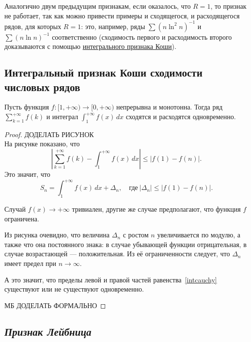 \begin{remark}
	Аналогично двум предыдущим признакам, если оказалось, что \(R = 1\), то признак не работает, так как можно привести примеры и сходящегося, и расходящегося рядов, для которых \(R = 1\): это, например, ряды \(\sum (n \ln^2 n)^{-1}\) и \(\sum (n \ln n)^{-1}\) соответственно (сходимость первого и расходимость второго доказываются с помощью \hyperlink{интегральный признак Коши}{ интегрального признака Коши}).
\end{remark}

\subsection{Интегральный признак Коши сходимости числовых рядов}

\begin{theorem} \hypertarget{интегральный признак Коши}{}
	Пусть функция \(f \colon [1, +\infty) \to [0, +\infty)\) непрерывна и монотонна. Тогда ряд \(\displaystyle \sum_{k=1}^{+\infty} f(k)\) и интеграл \(\displaystyle \int_{1}^{+\infty} f(x) \, dx\) сходятся и расходятся одновременно.
\end{theorem}
\begin{proof}
	ДОДЕЛАТЬ РИСУНОК \\
	На рисунке показано, что \[
	\left|\sum_{k=1}^{+\infty} f(k) - \int_{1}^{+\infty} f(x) \, dx \right| \leqslant |f(1) - f(n)|.
	\]
	Это значит, что
	\begin{equation} \label{intcauchy}
		S_n = \displaystyle \int_{1}^{+\infty} f(x) \, dx + \Delta_n, \quad \text{где} \ |\Delta_n| \leqslant |f(1) - f(n)|.
	\end{equation}
	
	Случай \(f(x) \to +\infty\) тривиален, другие же случае предполагают, что функция \(f\) ограничена.
	
	Из рисунка очевидно, что величина \(\Delta_n\) с ростом \(n\) увеличивается по модулю, а также что она постоянного знака: в случае убывающей функции отрицательная, в случае возрастающей --- положительная. Из её ограниченности следует, что \(\Delta_n\) имеет предел при  \(n \to \infty\).
	
	А это значит, что пределы левой и правой частей равенства~\eqref{intcauchy} существуют или не существуют одновременно.
	
	МБ ДОДЕЛАТЬ ФОРМАЛЬНО
\end{proof}

\subsection{\itshape Признак Лейбница}

